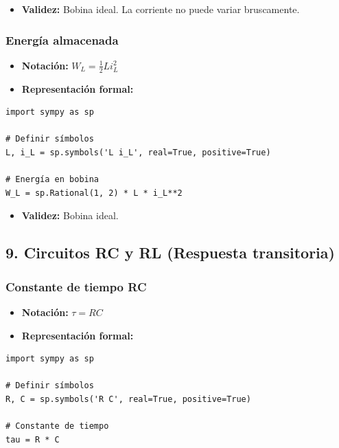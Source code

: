\documentclass[11pt,a4paper]{article}
\begin{document}
\begin{itemize}[leftmargin=*,topsep=2pt,itemsep=1pt]
  \item \textbf{Validez:} Bobina ideal. La corriente no puede variar bruscamente.
\end{itemize}


\subsubsection*{Energía almacenada}


\begin{itemize}[leftmargin=*,topsep=2pt,itemsep=1pt]
  \item \textbf{Notación:} $W_L = \frac{1}{2} L i_L^2$
  \item \textbf{Representación formal:}
\end{itemize}


\begin{lstlisting}
import sympy as sp

# Definir símbolos
L, i_L = sp.symbols('L i_L', real=True, positive=True)

# Energía en bobina
W_L = sp.Rational(1, 2) * L * i_L**2
\end{lstlisting}


\begin{itemize}[leftmargin=*,topsep=2pt,itemsep=1pt]
  \item \textbf{Validez:} Bobina ideal.
\end{itemize}


\subsection*{9. Circuitos RC y RL (Respuesta transitoria)}


\subsubsection*{Constante de tiempo RC}


\begin{itemize}[leftmargin=*,topsep=2pt,itemsep=1pt]
  \item \textbf{Notación:} $\tau = RC$
  \item \textbf{Representación formal:}
\end{itemize}


\begin{lstlisting}
import sympy as sp

# Definir símbolos
R, C = sp.symbols('R C', real=True, positive=True)

# Constante de tiempo
tau = R * C
\end{lstlisting}
\end{document}
